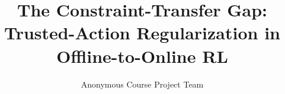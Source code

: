 \documentclass{article}
\title{The Constraint-Transfer Gap: Trusted-Action Regularization in Offline-to-Online RL}
\author{Anonymous Course Project Team}
\begin{document}
\maketitle

\begin{abstract}

\end{abstract}











\appendix

\end{document}
